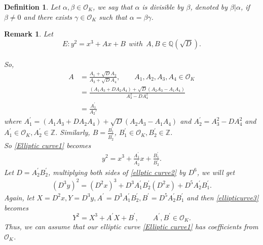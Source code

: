 \documentclass[12pt,leqno]{amsart}
\newcommand{\<}{\langle}
\renewcommand{\>}{\rangle}
\newtheorem*{definition}{Definition}
\newtheorem{rmk}{Remark}
\theoremstyle{definition}
\numberwithin{equation}{section}
\begin{document}
\begin{definition}
    Let $\alpha,\beta\in{\mathcal{O}_K}$, we say that $\alpha$ is divisible by $\beta$, denoted by $\beta\vert \alpha$, if $\beta\neq 0$ and there exists $\gamma\in {\mathcal{O}_K}$ such that $\alpha=\beta \gamma$. 
\end{definition}
 \begin{rmk}
     Let \begin{equation}\label{Elliptic curve1}
         E:y^2=x^3+Ax+B ~~with~~ A,B\in \mathbb Q(\sqrt{D}).
     \end{equation}\\ So,
     \begin{align*}
         A&=\frac{A_1+\sqrt{D}A_2}{A_3+\sqrt{D}A_4},\qquad A_1,A_2,A_3,A_4\in{\mathcal{O}_K}\\
         &=\frac{(A_1A_3+DA_2A_4)+\sqrt{D}(A_2A_3-A_1A_4)}{A_3^2-DA_4^2}\\
         &=\frac{A_1^{'}}{A_2{'}}
     \end{align*}
     where $A_1^{'}=(A_1A_3+DA_2A_4)+\sqrt{D}(A_2A_3-A_1A_4)$ and $A_2^{'}=A_3^2-DA_4^2$ and $A_1^{'}\in {\mathcal{O}}_K, A_{2}^{'}\in \mathbb Z$.
\smallskip
Similarly, $B=\frac{B_{1}^{'}}{B_{2}^{'}}$, $B_{1}^{'}\in{\mathcal{O}_K},B_{2}^{'}\in\mathbb Z$.\\
So \eqref{Elliptic curve1} becomes
\begin{align*}
    y^{2}=x^{3}+\frac{A_{1}^{'}}{A_{2}^{'}}x+\frac{B_{1}^{'}}{B_{2}^{'}}.
\end{align*}\label{ellptic curve2}
Let $D=A_{2}^{'}B_{2}^{'}$, multiplying both sides of \eqref{ellptic curve2} by $D^6$, we will get
\begin{align*}
    (D^3y)^2=(D^2x)^3+D^3A_{1}^{'}B_{2}^{'}(D^2x)+D^5A_{2}^{'}B_{1}^{'}.
\end{align*}\label{ellipticurve3}
Again, let $X=D^2x, Y=D^3y, A^{'}=D^3A_{1}^{'}B_{2}^{'}, B^{'}=D^5A_{2}^{'}B_{1}^{'}$ and then \eqref{ellipticurve3} becomes\\
\begin{equation}
    Y^{2}=X^3+A^{'}X+B^{'}, \qquad A^{'},B^{'}\in{\mathcal{O}_K}.
\end{equation}
Thus, we can assume that our elliptic curve \eqref{Elliptic curve1} has coefficients from $\mathcal{O}_K$.
 \end{rmk}





 
\end{document}
